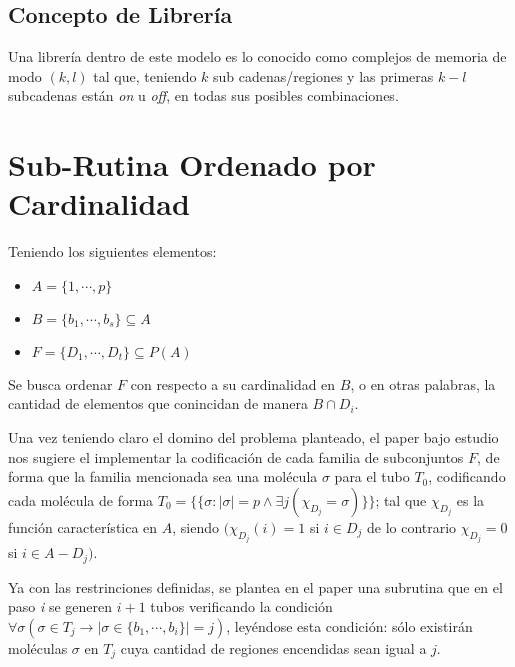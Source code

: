 \documentclass[12pt, letterpaper, twoside]{article}
\begin{document}
    \subsection{Concepto de Librería}
    \par Una librería dentro de este modelo es lo conocido como complejos de memoria de modo $(k,l)$ tal que, teniendo $k$ sub cadenas/regiones y las primeras $k - l$ subcadenas están \emph{on} u \emph{off}, en todas sus posibles combinaciones.

    \section{Sub-Rutina Ordenado por Cardinalidad}
    \par Teniendo los siguientes elementos:
    \begin{itemize}
        \item $A = \{1,\cdots,p\}$
        \item $B = \{b_1,\cdots,b_s\} \subseteq A$ 
        \item $F = \{D_1,\cdots,D_t\} \subseteq P(A)$ 
    \end{itemize}
    \par Se busca ordenar $F$ con respecto a su cardinalidad en $B$, o en otras palabras, la cantidad de elementos que conincidan de manera $B\cap D_i$.
    \par Una vez teniendo claro el domino del problema planteado, el paper bajo estudio nos sugiere el implementar la codificación de cada familia de subconjuntos $F$, de forma que la familia mencionada sea una molécula $\sigma$ para el tubo $T_0$, codificando cada molécula de forma $T_0=\{\{\sigma:|\sigma|=p \land \exists j(\chi_{D_j}=\sigma)\}\}$; tal que $\chi_{D_j}$ es la función característica en $A$, siendo $(\chi_{D_j}(i) = 1$ si $i \in D_j$ de lo contrario $\chi_{D_j} = 0$ si $i \in A - D_j)$.
    \par Ya con las restrinciones definidas, se plantea en el paper una subrutina que en el paso \emph{i} se generen $i + 1$ tubos verificando la condición $\forall\sigma(\sigma\in T_j \rightarrow|\sigma\in\{b_1,\cdots,b_i\}|=j)$, leyéndose esta condición: sólo existirán moléculas $\sigma$ en $T_j$ cuya cantidad de regiones encendidas sean igual a $j$.
\end{document}
